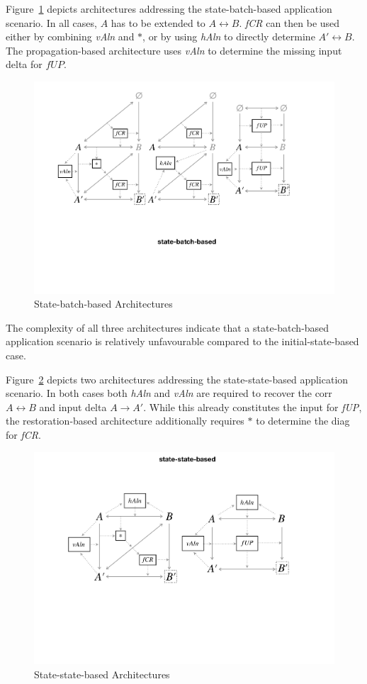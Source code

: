 Figure~\ref{fig:stateBatchBased} depicts architectures addressing the state-batch-based application scenario.
In all cases, $A$ has to be extended to $A \leftrightarrow B$.
\emph{fCR} can then be used either by combining \emph{vAln} and $\ast$, or by using \emph{hAln} to directly determine $A' \leftrightarrow B$.
The propagation-based architecture uses \emph{vAln} to determine the missing input delta for $fUP$.
%
\begin{figure}[tb!]
	\centering
	\includegraphics[width=\columnwidth]{diagrams/foundations//state-batch-based}
	\caption{State-batch-based Architectures}
	\label{fig:stateBatchBased}
\end{figure}
%
The complexity of all three architectures indicate that a state-batch-based application scenario is relatively unfavourable compared to the initial-state-based case.

Figure~\ref{fig:stateStateBased} depicts two architectures addressing the state-state-based application scenario.
In both cases both \emph{hAln} and \emph{vAln} are required to recover the corr $A \leftrightarrow B$ and input delta $A \rightarrow A'$.
While this already constitutes the input for \emph{fUP}, the restoration-based architecture additionally requires $\ast$ to determine the diag for \emph{fCR}.
%
\begin{figure}[tb!]
	\centering
	\includegraphics[width=\columnwidth]{diagrams/foundations//state-state-based}
	\caption{State-state-based Architectures}
	\label{fig:stateStateBased}
\end{figure}

